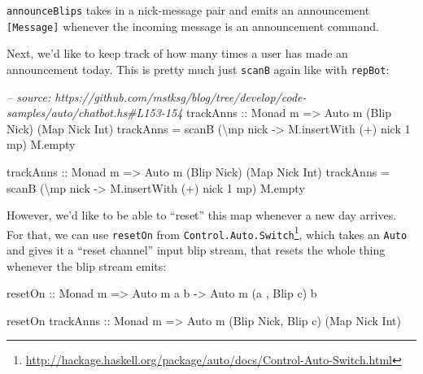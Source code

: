 \documentclass[]{article}
\newenvironment{Shaded}{}{}
\newcommand{\DataTypeTok}[1]{\textcolor[rgb]{0.56,0.13,0.00}{{#1}}}
\newcommand{\DecValTok}[1]{\textcolor[rgb]{0.25,0.63,0.44}{{#1}}}
\newcommand{\CommentTok}[1]{\textcolor[rgb]{0.38,0.63,0.69}{\textit{{#1}}}}
\newcommand{\OtherTok}[1]{\textcolor[rgb]{0.00,0.44,0.13}{{#1}}}
\newcommand{\FunctionTok}[1]{\textcolor[rgb]{0.02,0.16,0.49}{{#1}}}
\newcommand{\NormalTok}[1]{{#1}}
\renewcommand{\href}[2]{#2\footnote{\url{#1}}}
\begin{document}
\texttt{announceBlips} takes in a nick-message pair and emits an announcement
\texttt{{[}Message{]}} whenever the incoming message is an announcement command.

Next, we'd like to keep track of how many times a user has made an announcement
today. This is pretty much just \texttt{scanB} again like with \texttt{repBot}:

\begin{Shaded}
\begin{Highlighting}[]
\CommentTok{-- source: https://github.com/mstksg/blog/tree/develop/code-samples/auto/chatbot.hs#L153-154}
\OtherTok{    trackAnns ::} \DataTypeTok{Monad} \NormalTok{m }\OtherTok{=>} \DataTypeTok{Auto} \NormalTok{m (}\DataTypeTok{Blip} \DataTypeTok{Nick}\NormalTok{) (}\DataTypeTok{Map} \DataTypeTok{Nick} \DataTypeTok{Int}\NormalTok{)}
    \NormalTok{trackAnns }\FunctionTok{=} \NormalTok{scanB (\textbackslash{}mp nick }\OtherTok{->} \NormalTok{M.insertWith (}\FunctionTok{+}\NormalTok{) nick }\DecValTok{1} \NormalTok{mp) M.empty}



\OtherTok{trackAnns ::} \DataTypeTok{Monad} \NormalTok{m }\OtherTok{=>} \DataTypeTok{Auto} \NormalTok{m (}\DataTypeTok{Blip} \DataTypeTok{Nick}\NormalTok{) (}\DataTypeTok{Map} \DataTypeTok{Nick} \DataTypeTok{Int}\NormalTok{)}
\NormalTok{trackAnns }\FunctionTok{=} \NormalTok{scanB (\textbackslash{}mp nick }\OtherTok{->} \NormalTok{M.insertWith (}\FunctionTok{+}\NormalTok{) nick }\DecValTok{1} \NormalTok{mp) M.empty}
\end{Highlighting}
\end{Shaded}

However, we'd like to be able to ``reset'' this map whenever a new day arrives.
For that, we can use \texttt{resetOn} from
\href{http://hackage.haskell.org/package/auto/docs/Control-Auto-Switch.html}{\texttt{Control.Auto.Switch}},
which takes an \texttt{Auto} and gives it a ``reset channel'' input blip stream,
that resets the whole thing whenever the blip stream emits:

\begin{Shaded}
\begin{Highlighting}[]
\OtherTok{resetOn ::} \DataTypeTok{Monad} \NormalTok{m }\OtherTok{=>} \DataTypeTok{Auto} \NormalTok{m a b }\OtherTok{->} \DataTypeTok{Auto} \NormalTok{m (a        , }\DataTypeTok{Blip} \NormalTok{c) b}

\NormalTok{resetOn}\OtherTok{ trackAnns ::} \DataTypeTok{Monad} \NormalTok{m }\OtherTok{=>}     \DataTypeTok{Auto} \NormalTok{m (}\DataTypeTok{Blip} \DataTypeTok{Nick}\NormalTok{, }\DataTypeTok{Blip} \NormalTok{c) (}\DataTypeTok{Map} \DataTypeTok{Nick} \DataTypeTok{Int}\NormalTok{)}
\end{Highlighting}
\end{Shaded}
\end{document}
